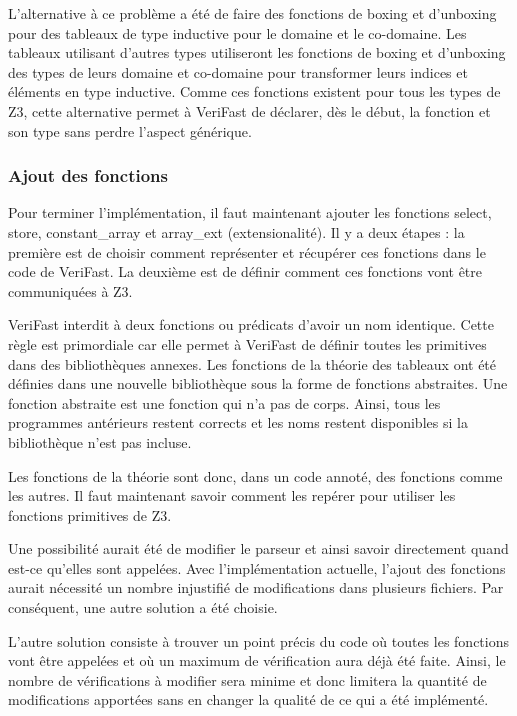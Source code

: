 \documentclass[11pt,openany]{article}
\newcommand{\verifast}{VeriFast}
\begin{document}
			L'alternative \`a ce probl\`eme a \'et\'e de faire des fonctions de boxing et d'unboxing pour des tableaux de type inductive pour le domaine et le co-domaine. Les tableaux utilisant d'autres types utiliseront les fonctions de boxing et d'unboxing des types de leurs domaine et co-domaine pour transformer leurs indices et \'el\'ements en type inductive. Comme ces fonctions existent pour tous les types de Z3, cette alternative permet \`a \verifast{} de d\'eclarer, d\`es le d\'ebut, la fonction et son type sans perdre l'aspect g\'en\'erique.
			
			
		\subsubsection{Ajout des fonctions}
	Pour terminer l'impl\'ementation, il faut maintenant ajouter les fonctions select, store, constant\_array et array\_ext (extensionalit\'e). Il y a deux \'etapes : la premi\`ere est de choisir comment repr\'esenter  et r\'ecup\'erer ces fonctions dans le code de \verifast{}. La deuxi\`eme est de d\'efinir comment ces fonctions vont \^etre communiqu\'ees \`a Z3.
	
		\verifast{} interdit \`a deux fonctions ou pr\'edicats d'avoir un nom identique. Cette r\`egle est primordiale car elle permet \`a \verifast{} de d\'efinir toutes les primitives dans des biblioth\`eques annexes. Les fonctions de la th\'eorie des tableaux ont \'et\'e d\'efinies dans une nouvelle biblioth\`eque sous la forme de fonctions abstraites. Une fonction abstraite est une fonction qui n'a pas de corps. Ainsi, tous les programmes ant\'erieurs restent corrects et les noms restent disponibles si la biblioth\`eque n'est pas incluse.
		
		Les fonctions de la th\'eorie sont donc, dans un code annot\'e, des fonctions comme les autres. Il faut maintenant savoir comment les rep\'erer pour utiliser les fonctions primitives de Z3.
		
		Une possibilit\'e aurait \'et\'e de modifier le parseur et ainsi savoir directement quand est-ce qu'elles sont appel\'ees. Avec l'impl\'ementation actuelle, l'ajout des fonctions aurait n\'ecessit\'e un nombre injustifi\'e de modifications dans plusieurs fichiers. Par cons\'equent, une autre solution a \'et\'e choisie. 
		
		L'autre solution consiste \`a trouver un point pr\'ecis du code o\`u toutes les fonctions vont \^etre appel\'ees et o\`u un maximum de v\'erification aura d\'ej\`a \'et\'e faite. Ainsi, le nombre de v\'erifications \`a modifier sera minime et donc limitera la quantit\'e de modifications apport\'ees sans en changer la qualit\'e de ce qui a \'et\'e impl\'ement\'e.
		
\end{document}
